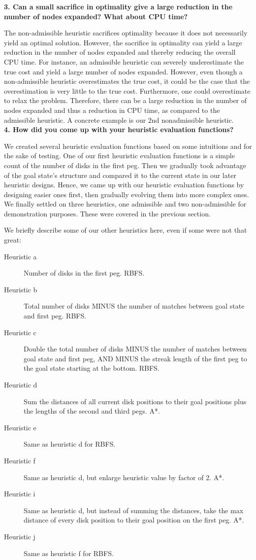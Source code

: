 \textbf{3. Can a small sacrifice in optimality give a large reduction in the number of nodes expanded? What about CPU time?}

The non-admissible heuristic sacrifices optimality because it does not necessarily yield an optimal solution. However, the sacrifice in optimality can yield a large reduction in the number of nodes expanded and thereby reducing the overall CPU time. For instance, an admissible heuristic can severely underestimate the true cost and yield a large number of nodes expanded. However, even though a non-admissible heuristic overestimates the true cost, it could be the case that the overestimation is very little to the true cost. Furthermore, one could overestimate to relax the problem. Therefore, there can be a large reduction in the number of nodes expanded and thus a reduction in CPU time, as compared to the admissible heuristic. A concrete example is our 2nd nonadmissible heuristic.\\

\textbf{4. How did you come up with your heuristic evaluation functions?}

We created several heuristic evaluation functions based on some intuitions and for the sake of testing. One of our first heuristic evaluation functions is a simple count of the number of disks in the first peg. Then we gradually took advantage of the goal state's structure and compared it to the current state in our later heuristic designs. Hence, we came up with our heuristic evaluation functions by designing easier ones first, then gradually evolving them into more complex ones. We finally settled on three heuristics, one admissible and two non-admissible for demonstration purposes. These were covered in the previous section. 

We briefly describe some of our other heuristics here, even if some were not that great:

\begin{description}
	\item[Heuristic a] Number of disks in the first peg. RBFS.
	\item[Heuristic b] Total number of disks MINUS the number of matches between goal state and first peg. RBFS.
	\item[Heuristic c] Double the total number of disks MINUS the number of matches between goal state and first peg, AND MINUS the streak length of the first peg to the goal state starting at the bottom. RBFS.
	\item[Heuristic d] Sum the distances of all current disk positions to their goal positions plus the lengths of the second and third pegs. A*.
	\item[Heuristic e] Same as heuristic d for RBFS.
	\item[Heuristic f] Same as heuristic d, but enlarge heuristic value by factor of 2. A*. 
	\item[Heuristic i] Same as heuristic d, but instead of summing the distances, take the max distance of every disk position to their goal position on the first peg. A*.
	\item[Heuristic j] Same as heuristic f for RBFS.
\end{description}

